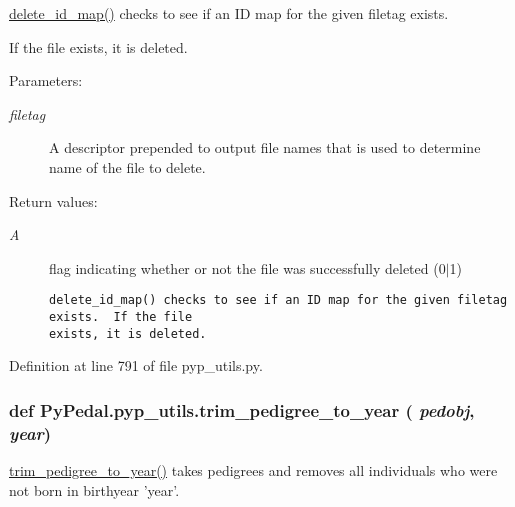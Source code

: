 \hyperlink{namespacePyPedal_1_1pyp__utils_b39a83bc8fb8a42eacae9c1841784e64}{delete\_\-id\_\-map()} checks to see if an ID map for the given filetag exists. 

If the file exists, it is deleted. \begin{Desc}
\item[Parameters:]
\begin{description}
\item[{\em filetag}]A descriptor prepended to output file names that is used to determine name of the file to delete. \end{description}
\end{Desc}
\begin{Desc}
\item[Return values:]
\begin{description}
\item[{\em A}]flag indicating whether or not the file was successfully deleted (0$|$1)

\footnotesize\begin{verbatim}delete_id_map() checks to see if an ID map for the given filetag exists.  If the file
exists, it is deleted.
\end{verbatim}
\normalsize
 \end{description}
\end{Desc}


Definition at line 791 of file pyp\_\-utils.py.\hypertarget{namespacePyPedal_1_1pyp__utils_2c5ccf3f25a2ef31bc3d8c671a3a5ea8}{
\subsubsection[trim\_\-pedigree\_\-to\_\-year]{\setlength{\rightskip}{0pt plus 5cm}def Py\-Pedal.pyp\_\-utils.trim\_\-pedigree\_\-to\_\-year ( {\em pedobj},  {\em year})}}
\label{namespacePyPedal_1_1pyp__utils_2c5ccf3f25a2ef31bc3d8c671a3a5ea8}


\hyperlink{namespacePyPedal_1_1pyp__utils_2c5ccf3f25a2ef31bc3d8c671a3a5ea8}{trim\_\-pedigree\_\-to\_\-year()} takes pedigrees and removes all individuals who were not born in birthyear 'year'. 

